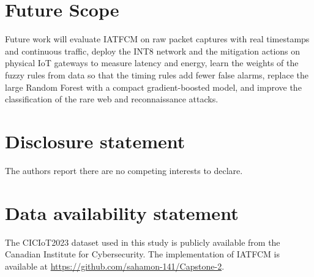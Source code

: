 \documentclass[]{interact}
\theoremstyle{plain}
\theoremstyle{definition}
\begin{document}
\section{Future Scope}
Future work will evaluate IATFCM on raw packet captures with real timestamps and continuous traffic, deploy the INT8 network and the mitigation actions on physical IoT gateways to measure latency and energy, learn the weights of the fuzzy rules from data so that the timing rules add fewer false alarms, replace the large Random Forest with a compact gradient-boosted model, and improve the classification of the rare web and reconnaissance attacks.

\section*{Disclosure statement}
The authors report there are no competing interests to declare.

\section*{Data availability statement}
The CICIoT2023 dataset used in this study is publicly available from the Canadian Institute for Cybersecurity. The implementation of IATFCM is available at \url{https://github.com/sahamon-141/Capstone-2}.



\end{document}
